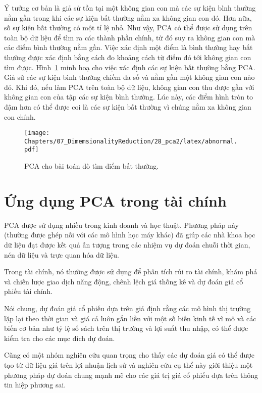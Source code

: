 Ý tưởng cơ bản là giả sử tồn tại một không gian con mà các sự kiện bình thường
nằm gần trong khi các sự kiện bất thường nằm xa không gian con đó. Hơn nữa, số
sự kiện bất thường có một tỉ lệ nhỏ. Như vậy, PCA có thể được sử dụng trên toàn
bộ dữ liệu để tìm ra các thành phần chính, từ đó suy ra không gian con mà các điểm bình thường nằm gần.
Việc xác định một điểm là bình thường hay bất thường được xác định bằng cách đo
khoảng cách từ điểm đó tới không gian con tìm được. Hình~\ref{fig:28_4} minh hoạ
cho việc xác định các sự kiện bất thường bằng PCA. Giả sử các sự kiện {bình thường} chiếm đa số và nằm gần  một không
gian con nào đó. Khi đó, nếu làm PCA trên toàn bộ dữ liệu, không gian con thu được gần với không gian con của tập các sự kiện {bình thường}. Lúc này, các điểm hình tròn to đậm hơn có thể được coi là các sự kiện {bất thường} vì chúng nằm xa không gian con chính.

\begin{figure}[ht]
	\centering
			\texttt{[image: Chapters/07\_DimemsionalityReduction/28\_pca2/latex/abnormal.pdf]}
	\caption{ PCA cho bài toán dò tìm điểm bất thường.}
		\label{fig:28_4}


\end{figure}
\section{Ứng dụng PCA trong tài chính}
PCA được sử dụng nhiều trong kinh doanh và học thuật. Phương pháp này (thường được ghép nối với các mô hình học máy khác) đã giúp các nhà khoa học dữ liệu đạt được kết quả ấn tượng trong các nhiệm vụ dự đoán chuỗi thời gian, nén dữ liệu và trực quan hóa dữ liệu.

Trong tài chính, nó thường được sử dụng để phân tích rủi ro tài chính, khám phá và chiến lược giao dịch năng động, chênh lệch giá thống kê và dự đoán giá cổ phiếu tài chính.

Nói chung, dự đoán giá cổ phiếu dựa trên giả định rằng các mô hình thị trường lặp lại theo thời gian và giá cả luôn gắn liền với một số biến kinh tế vĩ mô và các biến cơ bản như tỷ lệ sổ sách trên thị trường và lợi suất thu nhập, có thể được kiểm tra cho các mục đích dự đoán.

Cũng có một nhóm nghiên cứu quan trọng cho thấy các dự đoán giá có thể được tạo từ dữ liệu giá trên lợi nhuận lịch sử và nghiên cứu cụ thể này giới thiệu một phương pháp dự đoán chung mạnh mẽ cho các giá trị giá cổ phiếu dựa trên thông tin hiệp phương sai.


